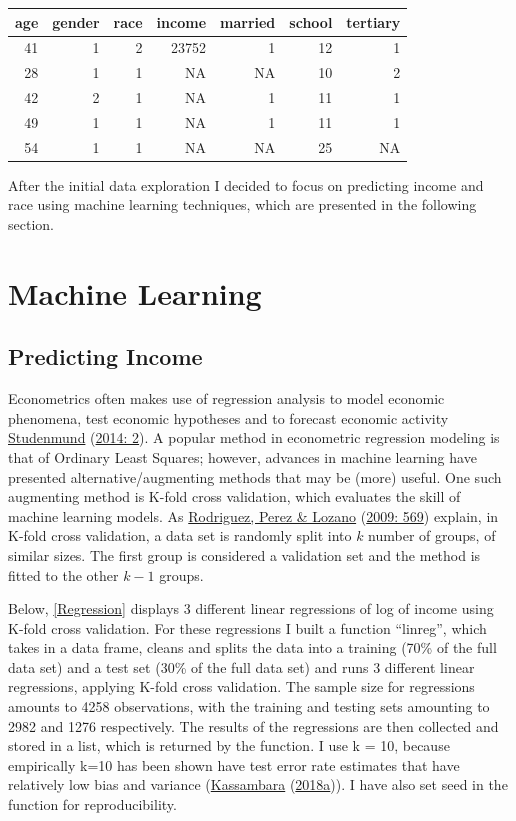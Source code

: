 \documentclass[11pt,preprint, authoryear]{elsarticle}
\numberwithin{equation}{section}
\numberwithin{figure}{section}
\numberwithin{table}{section}
\begin{document}
\begin{tabular}{r|r|r|r|r|r|r}
\hline
age & gender & race & income & married & school & tertiary\\
\hline
41 & 1 & 2 & 23752 & 1 & 12 & 1\\
\hline
28 & 1 & 1 & NA & NA & 10 & 2\\
\hline
42 & 2 & 1 & NA & 1 & 11 & 1\\
\hline
49 & 1 & 1 & NA & 1 & 11 & 1\\
\hline
54 & 1 & 1 & NA & NA & 25 & NA\\
\hline
\end{tabular}

After the initial data exploration I decided to focus on predicting
income and race using machine learning techniques, which are presented
in the following section.

\hypertarget{machine-learning}{%
\section{\texorpdfstring{Machine Learning
\label{ML}}{Machine Learning }}\label{machine-learning}}

\hypertarget{predicting-income}{%
\subsection{\texorpdfstring{Predicting Income
\label{income}}{Predicting Income }}\label{predicting-income}}

Econometrics often makes use of regression analysis to model economic
phenomena, test economic hypotheses and to forecast economic activity
\protect\hyperlink{ref-econ}{Studenmund}
(\protect\hyperlink{ref-econ}{2014: 2}). A popular method in econometric
regression modeling is that of Ordinary Least Squares; however, advances
in machine learning have presented alternative/augmenting methods that
may be (more) useful. One such augmenting method is K-fold cross
validation, which evaluates the skill of machine learning models. As
\protect\hyperlink{ref-kfold}{Rodriguez, Perez \& Lozano}
(\protect\hyperlink{ref-kfold}{2009: 569}) explain, in K-fold cross
validation, a data set is randomly split into \(k\) number of groups, of
similar sizes. The first group is considered a validation set and the
method is fitted to the other \(k-1\) groups.

Below, \ref{Regression} displays 3 different linear regressions of log
of income using K-fold cross validation. For these regressions I built a
function ``linreg'', which takes in a data frame, cleans and splits the
data into a training (70\% of the full data set) and a test set (30\% of
the full data set) and runs 3 different linear regressions, applying
K-fold cross validation. The sample size for regressions amounts to 4258
observations, with the training and testing sets amounting to 2982 and
1276 respectively. The results of the regressions are then collected and
stored in a list, which is returned by the function. I use k = 10,
because empirically k=10 has been shown have test error rate estimates
that have relatively low bias and variance
(\protect\hyperlink{ref-k}{Kassambara}
(\protect\hyperlink{ref-k}{2018a})). I have also set seed in the
function for reproducibility.
\end{document}
